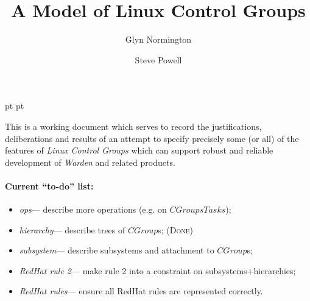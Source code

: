\documentclass[a4paper,twoside,12pt]{article}
\begin{document}
 pt
 pt

\def\Slash{\slash\hspace{0pt}}

\title{A Model of Linux Control Groups}

\author{
Glyn Normington\and
Steve Powell
}

\maketitle
\thispagestyle{myheadings}
\setcounter{page}{1}


This is a working document which serves to record the justifications, deliberations and results of an attempt to
specify precisely some (or all) of the features of \emph{Linux Control Groups} which can support robust and reliable development of \emph{Warden} and related products.

\paragraph{Current ``to-do'' list:}
\begin{itemize}
\item \emph{ops}--- describe more operations (e.g. on $CGroupsTasks$);
\item \emph{hierarchy}--- describe trees of $CGroup$s; (\textsc{Done})
\item \emph{subsystem}--- describe subsystems and attachment to $CGroup$s;
\item \emph{RedHat rule 2}--- make rule 2 into a constraint on subsystems+hierarchies;
\item \emph{RedHat rules}--- ensure all RedHat rules are represented correctly.
\end{itemize}



\newcommand{\true}{true}
\newcommand{\false}{false}
\renewcommand{\emptyset}{\varnothing}

\clearpage
\tableofcontents
\end{document}
